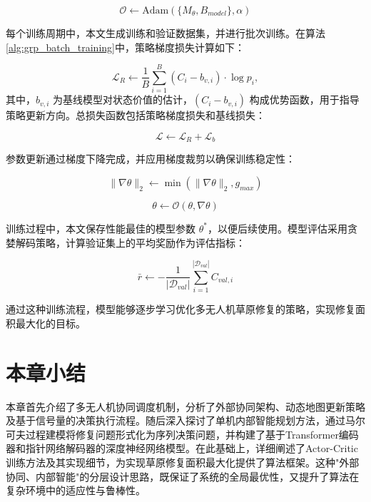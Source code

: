 \documentclass[AutoFakeBold]{LZUThesis}
\begin{document}
\begin{equation}
	\mathcal{O} \leftarrow \text{Adam}(\{M_{\theta}, B_{model}\}, \alpha)
\end{equation}

每个训练周期中，本文生成训练和验证数据集，并进行批次训练。在算法\ref{alg:grp_batch_training}中，策略梯度损失计算如下：

\begin{equation}
	\mathcal{L}_{R} \leftarrow \frac{1}{B}\sum_{i=1}^{B}(C_i - b_{v,i}) \cdot \log p_i,
\end{equation}
其中，$b_{v,i}$ 为基线模型对状态价值的估计，$(C_i - b_{v,i})$ 构成优势函数，用于指导策略更新方向。总损失函数包括策略梯度损失和基线损失：

\begin{equation}
	\mathcal{L} \leftarrow \mathcal{L}_{R} + \mathcal{L}_{b}
\end{equation}

参数更新通过梯度下降完成，并应用梯度裁剪以确保训练稳定性：

\begin{equation}
	\|\nabla\theta\|_2 \leftarrow \min(\|\nabla\theta\|_2, g_{max})
\end{equation}

\begin{equation}
	\theta \leftarrow \mathcal{O}(\theta, \nabla\theta)
\end{equation}

训练过程中，本文保存性能最佳的模型参数 $\theta^*$，以便后续使用。模型评估采用贪婪解码策略，计算验证集上的平均奖励作为评估指标：

\begin{equation}
	\bar{r} \leftarrow -\frac{1}{|\mathcal{D}_{val}|}\sum_{i=1}^{|\mathcal{D}_{val}|} C_{val,i}
\end{equation}

通过这种训练流程，模型能够逐步学习优化多无人机草原修复的策略，实现修复面积最大化的目标。

\section{本章小结}
本章首先介绍了多无人机协同调度机制，分析了外部协同架构、动态地图更新策略及基于信号量的决策执行流程。随后深入探讨了单机内部智能规划方法，通过马尔可夫过程建模将修复问题形式化为序列决策问题，并构建了基于Transformer编码器和指针网络解码器的深度神经网络模型。在此基础上，详细阐述了Actor-Critic训练方法及其实现细节，为实现草原修复面积最大化提供了算法框架。这种"外部协同、内部智能"的分层设计思路，既保证了系统的全局最优性，又提升了算法在复杂环境中的适应性与鲁棒性。
\end{document}
